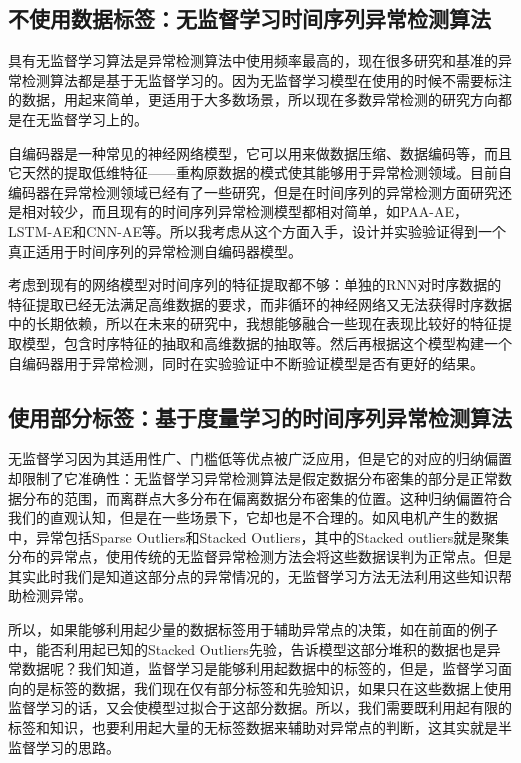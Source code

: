 \subsection{不使用数据标签：无监督学习时间序列异常检测算法}

具有无监督学习算法是异常检测算法中使用频率最高的，现在很多研究和基准的异常检测算法都是基于无监督学习的。因为无监督学习模型在使用的时候不需要标注的数据，用起来简单，更适用于大多数场景，所以现在多数异常检测的研究方向都是在无监督学习上的。

自编码器是一种常见的神经网络模型，它可以用来做数据压缩、数据编码等，而且它天然的提取低维特征——重构原数据的模式使其能够用于异常检测领域。目前自编码器在异常检测领域已经有了一些研究，但是在时间序列的异常检测方面研究还是相对较少，而且现有的时间序列异常检测模型都相对简单，如PAA-AE，LSTM-AE和CNN-AE等。所以我考虑从这个方面入手，设计并实验验证得到一个真正适用于时间序列的异常检测自编码器模型。

考虑到现有的网络模型对时间序列的特征提取都不够：单独的RNN对时序数据的特征提取已经无法满足高维数据的要求，而非循环的神经网络又无法获得时序数据中的长期依赖，所以在未来的研究中，我想能够融合一些现在表现比较好的特征提取模型，包含时序特征的抽取和高维数据的抽取等。然后再根据这个模型构建一个自编码器用于异常检测，同时在实验验证中不断验证模型是否有更好的结果。

\subsection{使用部分标签：基于度量学习的时间序列异常检测算法}

无监督学习因为其适用性广、门槛低等优点被广泛应用，但是它的对应的归纳偏置却限制了它准确性：无监督学习异常检测算法是假定数据分布密集的部分是正常数据分布的范围，而离群点大多分布在偏离数据分布密集的位置。这种归纳偏置符合我们的直观认知，但是在一些场景下，它却也是不合理的。如风电机产生的数据中，异常包括Sparse Outliers和Stacked Outliers，其中的Stacked outliers就是聚集分布的异常点，使用传统的无监督异常检测方法会将这些数据误判为正常点。但是其实此时我们是知道这部分点的异常情况的，无监督学习方法无法利用这些知识帮助检测异常。

所以，如果能够利用起少量的数据标签用于辅助异常点的决策，如在前面的例子中，能否利用起已知的Stacked Outliers先验，告诉模型这部分堆积的数据也是异常数据呢？我们知道，监督学习是能够利用起数据中的标签的，但是，监督学习面向的是标签的数据，我们现在仅有部分标签和先验知识，如果只在这些数据上使用监督学习的话，又会使模型过拟合于这部分数据。所以，我们需要既利用起有限的标签和知识，也要利用起大量的无标签数据来辅助对异常点的判断，这其实就是半监督学习的思路。

